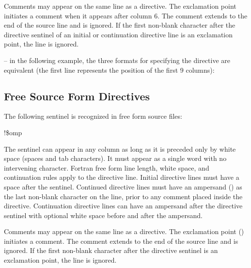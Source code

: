Comments may appear on the same line as a directive. The exclamation point initiates a 
comment when it appears after column 6. The comment extends to the end of the source 
line and is ignored. If the first non-blank character after the directive sentinel of an 
initial or continuation directive line is an exclamation point, the line is ignored.

\notestart
\noteheader – in the following example, the three formats for specifying the directive are 
equivalent (the first line represents the position of the first 9 columns):

\begin{alltt}
\end{alltt}
\noteend










\subsection{Free Source Form Directives}
\label{subsec:Free Source Form Directives}

The following sentinel is recognized in free form source files:

\begin{boxedcode}
!\$omp
\end{boxedcode}

The sentinel can appear in any column as long as it is preceded only by white space 
(spaces and tab characters). It must appear as a single word with no intervening 
character. Fortran free form line length, white space, and continuation rules apply to the 
directive line. Initial directive lines must have a space after the sentinel. Continued 
directive lines must have an ampersand (\code{\&}) as the last non-blank character on the line, 
prior to any comment placed inside the directive. Continuation directive lines can have 
an ampersand after the directive sentinel with optional white space before and after the 
ampersand.

Comments may appear on the same line as a directive. The exclamation point (\code{!}) 
initiates a comment. The comment extends to the end of the source line and is ignored. 
If the first non-blank character after the directive sentinel is an exclamation point, the 
line is ignored.

